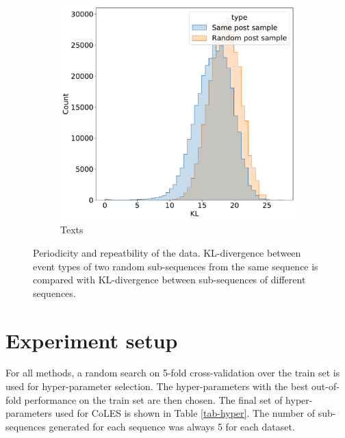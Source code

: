 \documentclass{article}
\begin{document}
\begin{figure}
\begin{subfigure}{0.5\linewidth}
  \end{subfigure}
  \begin{subfigure}{0.5\linewidth}
    \caption{Texts}
    \includegraphics[width=\linewidth]{figures/kl_dis_text.pdf}
  \end{subfigure}
  \caption{Periodicity and repeatbility of the data. KL-divergence between event types of two random sub-sequences from the same sequence is compared with KL-divergence between sub-sequences of different sequences.}
  \label{fig-subseq-kl}
\end{figure}

\section{Experiment setup} \label{app-sec-exp-setup}

For all methods, a random search on 5-fold cross-validation over the train set is used for hyper-parameter selection. The hyper-parameters with the best out-of-fold performance on the train set are then chosen. The final set of hyper-parameters used for CoLES is shown in Table \ref{tab-hyper}. The number of sub-sequences generated for each sequence was always 5 for each dataset.
\end{document}
